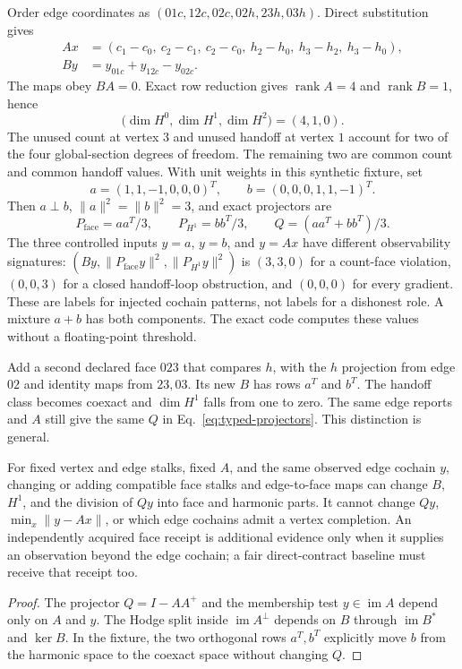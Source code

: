 \documentclass[11pt,a4paper]{article}
\begin{document}
Order edge coordinates as $(01c,12c,02c,02h,23h,03h)$. Direct substitution gives
\begin{align}\label{eq:typed-fixture}
Ax&=(c_1-c_0,\ c_2-c_1,\ c_2-c_0,\ h_2-h_0,\ h_3-h_2,\ h_3-h_0),\\
By&=y_{01c}+y_{12c}-y_{02c}.
\end{align}
The maps obey $BA=0$. Exact row reduction gives $\operatorname{rank}A=4$ and $\operatorname{rank}B=1$, hence
\[
\bigl(\dim H^0,\dim H^1,\dim H^2\bigr)=(4,1,0).
\]
The unused count at vertex $3$ and unused handoff at vertex $1$ account for two of the four global-section degrees of freedom. The remaining two are common count and common handoff values. With unit weights in this synthetic fixture, set
\[
a=(1,1,-1,0,0,0)^T,\qquad b=(0,0,0,1,1,-1)^T.
\]
Then $a\perp b$, $\|a\|^2=\|b\|^2=3$, and exact projectors are
\begin{equation}\label{eq:typed-projectors}
P_{\mathrm{face}}=aa^T/3,\qquad P_{H^1}=bb^T/3,\qquad Q=(aa^T+bb^T)/3.
\end{equation}
The three controlled inputs $y=a$, $y=b$, and $y=Ax$ have different observability signatures: $(By,\|P_{\mathrm{face}}y\|^2,\|P_{H^1}y\|^2)$ is $(3,3,0)$ for a count-face violation, $(0,0,3)$ for a closed handoff-loop obstruction, and $(0,0,0)$ for every gradient. These are labels for injected cochain patterns, not labels for a dishonest role. A mixture $a+b$ has both components. The exact code computes these values without a floating-point threshold.

Add a second declared face $023$ that compares $h$, with the $h$ projection from edge $02$ and identity maps from $23,03$. Its new $B$ has rows $a^T$ and $b^T$. The handoff class becomes coexact and $\dim H^1$ falls from one to zero. The same edge reports and $A$ still give the same $Q$ in Eq.~\ref{eq:typed-projectors}. This distinction is general.

\begin{theorem}\label{thm:face-invariance}
For fixed vertex and edge stalks, fixed $A$, and the same observed edge cochain $y$, changing or adding compatible face stalks and edge-to-face maps can change $B$, $H^1$, and the division of $Qy$ into face and harmonic parts. It cannot change $Qy$, $\min_x\|y-Ax\|$, or which edge cochains admit a vertex completion. An independently acquired face receipt is additional evidence only when it supplies an observation beyond the edge cochain; a fair direct-contract baseline must receive that receipt too.
\end{theorem}
\begin{proof}
The projector $Q=I-AA^+$ and the membership test $y\in\operatorname{im}A$ depend only on $A$ and $y$. The Hodge split inside $\operatorname{im}A^\perp$ depends on $B$ through $\operatorname{im}B^*$ and $\ker B$. In the fixture, the two orthogonal rows $a^T,b^T$ explicitly move $b$ from the harmonic space to the coexact space without changing $Q$.
\end{proof}
\end{document}
